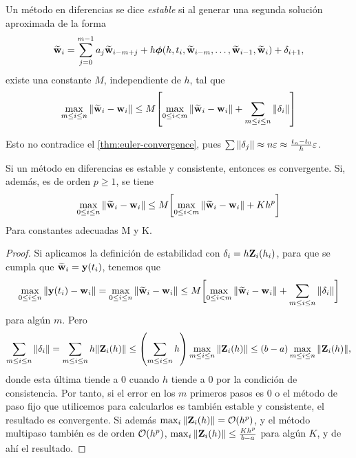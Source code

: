 \begin{definition}
    Un método en diferencias se dice \emph{estable}
    si al generar una segunda solución aproximada de la forma
    \begin{equation*}
        \vb{\widetilde{w}}{}_i = \sum_{j=0}^{m-1} {a_j\vb{\widetilde{w}}{}_{i-m+j}}
            + h\vb*{\phi}{}(h, t_i, \vb{\widetilde{w}}{}_{i-m}, \dots, \vb{\widetilde{w}}{}_{i-1}, \vb{\widetilde{w}}{}_i) + \delta_{i+1},
    \end{equation*}
    existe una constante $M$, independiente de $h$, tal que
    \begin{equation*} \label{stab}
        \max_{m \le i \le n}{\norm{\vb{\widetilde{w}}{}_i - \vb{w}{}_i}} \le M\qty[
            \max_{0 \le i < m}{\norm{\vb{\widetilde{w}}{}_i - \vb{w}{}_i}}
            + \sum_{m \le i \le n} \norm{\delta_i}
        ]
    \end{equation*}
\end{definition}

\begin{remark}
    Esto no contradice el \cref{thm:euler-convergence}, pues
    $\sum\norm{\delta_j} \approx n\varepsilon \approx
    \frac{t_n - t_0}{h}\varepsilon$.
\end{remark}

\begin{theorem}
    Si un método en diferencias es estable y consistente,
    entonces es convergente.
    Si, además, es de orden $p \geq 1$, se tiene
    \begin{equation*}
        \max_{0 \le i \le n}\norm{\vb{\widetilde{w}}{}_i - \vb{w}{}_i} \le M\qty\bigg[
            \max_{0 \le i < m} \norm{\vb{\widetilde{w}}{}_i - \vb{w}{}_i} + Kh^p
            ]
    \end{equation*}
    Para constantes adecuadas M y K.
\end{theorem}

\begin{proof}
    Si aplicamos la definición de estabilidad con $\delta_i = h\vb{Z}{}_i(h_i)$,
    para que se cumpla que $\vb{\widetilde{w}}{}_i = \vb{y}{}(t_i)$,
    tenemos que
    \begin{equation*}
        \max_{0 \le i \le n}\norm{\vb{y}{}(t_i) - \vb{w}{}_i} =
        \max_{0 \le i \le n}\norm{\vb{\widetilde{w}}{}_i - \vb{w}{}_i} \le
        M\qty\bigg[
            \max_{0 \le i < m}\norm{\vb{\widetilde{w}}{}_i - \vb{w}{}_i}
            + \sum_{m\le i \le n}\norm{\delta_i}
        ]
    \end{equation*}
    para algún $m$. Pero
    \begin{equation*}
        \sum_{m \le i \le n} \norm{\delta_i} =
        \sum_{m \le i \le n} h\norm{\vb{Z}{}_i(h)} \le
        \qty(\sum_{m \le i \le n} h)
            \max_{m \le i \le n}\norm{\vb{Z}{}_i(h)} \le
        (b-a)\max_{m \le i \le n}\norm{\vb{Z}{}_i(h)},
    \end{equation*}
    donde esta última tiende a $0$ cuando $h$ tiende a $0$
    por la condición de consistencia.
    Por tanto, si el error en los $m$ primeros pasos es $0$ o
    el método de paso fijo que utilicemos para calcularlos
    es también estable y consistente,
    el resultado es convergente.
    Si además $\max_i\norm{\vb{Z}{}_i(h)} = \vb{\mathcal{O}}{}(h^p)$,
    y el método multipaso también es de orden $\vb{\mathcal{O}}{}(h^p)$,
    $\max_i\norm{\vb{Z}{}_i(h)} \le \frac{Kh^p}{b-a}$ para algún $K$,
    y de ahí el resultado.
\end{proof}

